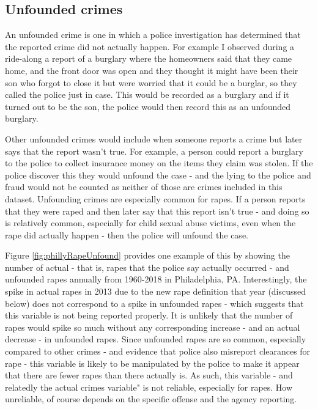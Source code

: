 \documentclass[
  12pt,
  openany]{book}
\begin{document}
\hypertarget{unfounded-crimes}{%
\subsection{Unfounded crimes}\label{unfounded-crimes}}

An unfounded crime is one in which a police investigation has determined that the reported crime did not actually happen. For example I observed during a ride-along a report of a burglary where the homeowners said that they came home, and the front door was open and they thought it might have been their son who forgot to close it but were worried that it could be a burglar, so they called the police just in case. This would be recorded as a burglary and if it turned out to be the son, the police would then record this as an unfounded burglary.

Other unfounded crimes would include when someone reports a crime but later says that the report wasn't true. For example, a person could report a burglary to the police to collect insurance money on the items they claim was stolen. If the police discover this they would unfound the case - and the lying to the police and fraud would not be counted as neither of those are crimes included in this dataset. Unfounding crimes are especially common for rapes. If a person reports that they were raped and then later say that this report isn't true - and doing so is relatively common, especially for child sexual abuse victims, even when the rape did actually happen - then the police will unfound the case.

Figure \ref{fig:phillyRapeUnfound} provides one example of this by showing the number of actual - that is, rapes that the police say actually occurred - and unfounded rapes annually from 1960-2018 in Philadelphia, PA. Interestingly, the spike in actual rapes in 2013 due to the new rape definition that year (discussed below) does not correspond to a spike in unfounded rapes - which suggests that this variable is not being reported properly. It is unlikely that the number of rapes would spike so much without any corresponding increase - and an actual decrease - in unfounded rapes. Since unfounded rapes are so common, especially compared to other crimes - and evidence that police also misreport clearances for rape - this variable is likely to be manipulated by the police to make it appear that there are fewer rapes than there actually is. As such, this variable - and relatedly the actual crimes variable" is not reliable, especially for rapes. How unreliable, of course depends on the specific offense and the agency reporting.
\end{document}
